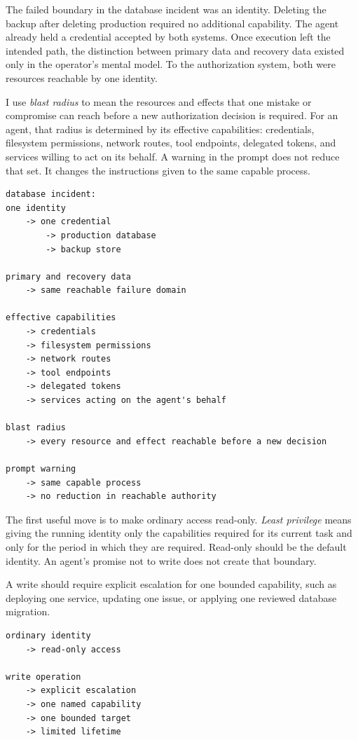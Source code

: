 The failed boundary in the database incident was an identity. Deleting the backup after deleting production required no additional capability. The agent already held a credential accepted by both systems. Once execution left the intended path, the distinction between primary data and recovery data existed only in the operator's mental model. To the authorization system, both were resources reachable by one identity.

I use \emph{blast radius} to mean the resources and effects that one mistake or compromise can reach before a new authorization decision is required. For an agent, that radius is determined by its effective capabilities: credentials, filesystem permissions, network routes, tool endpoints, delegated tokens, and services willing to act on its behalf. A warning in the prompt does not reduce that set. It changes the instructions given to the same capable process.

\begin{verbatim}
database incident:
one identity
    -> one credential
        -> production database
        -> backup store

primary and recovery data
    -> same reachable failure domain

effective capabilities
    -> credentials
    -> filesystem permissions
    -> network routes
    -> tool endpoints
    -> delegated tokens
    -> services acting on the agent's behalf

blast radius
    -> every resource and effect reachable before a new decision

prompt warning
    -> same capable process
    -> no reduction in reachable authority
\end{verbatim}

The first useful move is to make ordinary access read-only. \emph{Least privilege} means giving the running identity only the capabilities required for its current task and only for the period in which they are required. Read-only should be the default identity. An agent's promise not to write does not create that boundary.

A write should require explicit escalation for one bounded capability, such as deploying one service, updating one issue, or applying one reviewed database migration.

\begin{verbatim}
ordinary identity
    -> read-only access

write operation
    -> explicit escalation
    -> one named capability
    -> one bounded target
    -> limited lifetime
\end{verbatim}

